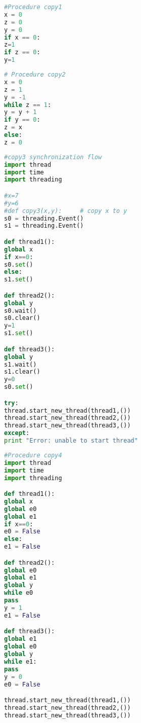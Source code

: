 \documentclass[]{article}
\begin{document}
\begin{lstlisting}[language=Python, caption=Python version of copy1 example in \cite{denning}. goal: information flow from x to y, label={lst:copy1} ]
#Procedure copy1
x = 0
z = 0
y = 0
if x == 0:
z=1
if z == 0:
y=1
\end{lstlisting}
\begin{lstlisting}[language=Python, caption=Python version of copy2 example in \cite{denning}. goal: information flow from x to y, label={lst:copy2} ]
# Procedure copy2
x = 0
z = 1
y = -1
while z == 1:
y = y + 1
if y == 0:
z = x
else:
z = 0
\end{lstlisting}


\begin{lstlisting}[language=Python, caption=Python version of copy3 example in \cite{denning}. goal: information flow from x to y, label={lst:copy3} ]
#copy3 synchronization flow
import thread
import time
import threading

#x=7
#y=6
#def copy3(x,y):     # copy x to y
s0 = threading.Event()
s1 = threading.Event()

def thread1():
global x
if x==0:
s0.set()
else:
s1.set()

def thread2():
global y
s0.wait()
s0.clear()
y=1
s1.set()

def thread3():
global y
s1.wait()
s1.clear()
y=0
s0.set()

try:
thread.start_new_thread(thread1,())
thread.start_new_thread(thread2,())
thread.start_new_thread(thread3,())
except:
print "Error: unable to start thread"

\end{lstlisting}


\begin{lstlisting}[language=Python, caption=Python version of copy4 example in \cite{denning}. goal: information flow from x to y, label={lst:copy4} ]
#Procedure copy4
import thread
import time
import threading

def thread1():
global x
global e0
global e1
if x==0:
e0 = False
else:
e1 = False

def thread2(): 
global e0
global e1
global y
while e0
pass
y = 1
e1 = False

def thread3():
global e1
global e0
global y
while e1:
pass
y = 0
e0 = False

thread.start_new_thread(thread1,())
thread.start_new_thread(thread2,())
thread.start_new_thread(thread3,())\end{lstlisting}
\end{document}
